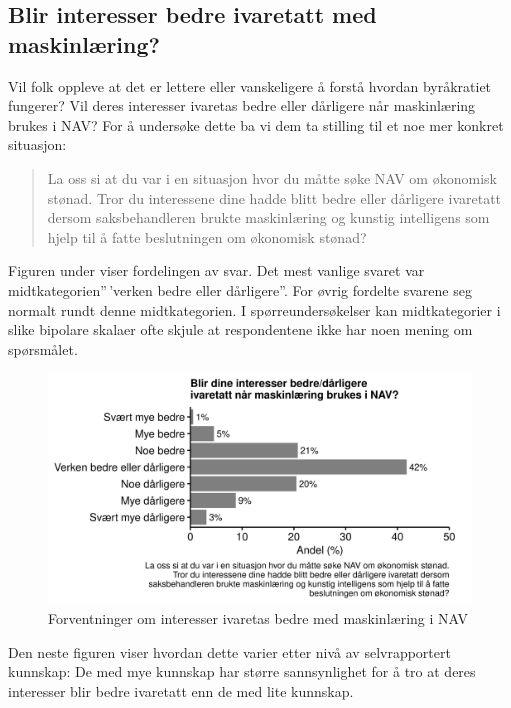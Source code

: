 \documentclass[
  12pt,
  a4paper, 12pt]{article}
\begin{document}
\hypertarget{blir-interesser-bedre-ivaretatt-med-maskinluxe6ring}{%
\subsection{Blir interesser bedre ivaretatt med maskinlæring?}\label{blir-interesser-bedre-ivaretatt-med-maskinluxe6ring}}

Vil folk oppleve at det er lettere eller vanskeligere å forstå hvordan byråkratiet fungerer?
Vil deres interesser ivaretas bedre eller dårligere når maskinlæring brukes i NAV?
For å undersøke dette ba vi dem ta stilling til et noe mer konkret situasjon:

\begin{quote}
La oss si at du var i en situasjon hvor du måtte søke NAV om økonomisk stønad. Tror du interessene dine hadde blitt bedre eller dårligere ivaretatt dersom saksbehandleren brukte maskinlæring og kunstig intelligens som hjelp til å fatte beslutningen om økonomisk stønad?
\end{quote}

Figuren under viser fordelingen av svar.
Det mest vanlige svaret var midtkategorien''\,'verken bedre eller dårligere''.
For øvrig fordelte svarene seg normalt rundt denne midtkategorien.
I spørreundersøkelser kan midtkategorier i slike bipolare skalaer ofte skjule at respondentene ikke har noen mening om spørsmålet.

\begin{figure}

{\centering \includegraphics[width=0.8\linewidth]{figs/png/fig_nav_ml_helps_interest} 

}

\caption{Forventninger om interesser ivaretas bedre med maskinlæring i NAV}\label{fig:unnamed-chunk-18}
\end{figure}

Den neste figuren viser hvordan dette varier etter nivå av selvrapportert kunnskap: De med mye kunnskap har større sannsynlighet for å tro at deres interesser blir bedre ivaretatt enn de med lite kunnskap.
\end{document}
